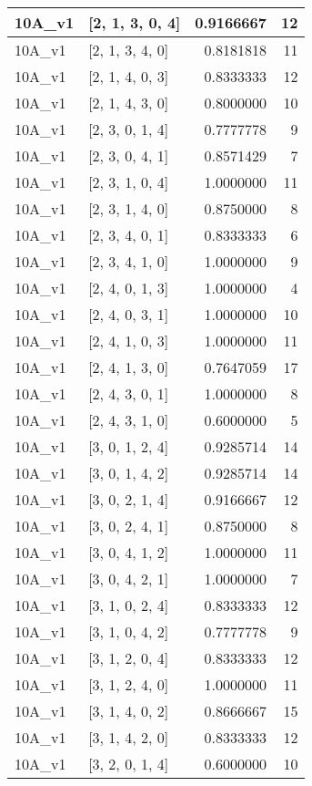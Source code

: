 \documentclass[]{book}
\theoremstyle{definition}
\theoremstyle{definition}
\theoremstyle{definition}
\theoremstyle{remark}
\begin{document}
\begin{tabular}{l|l|r|r}
\hline
10A\_v1 & [2, 1, 3, 0, 4] & 0.9166667 & 12\\
\hline
10A\_v1 & [2, 1, 3, 4, 0] & 0.8181818 & 11\\
\hline
10A\_v1 & [2, 1, 4, 0, 3] & 0.8333333 & 12\\
\hline
10A\_v1 & [2, 1, 4, 3, 0] & 0.8000000 & 10\\
\hline
10A\_v1 & [2, 3, 0, 1, 4] & 0.7777778 & 9\\
\hline
10A\_v1 & [2, 3, 0, 4, 1] & 0.8571429 & 7\\
\hline
10A\_v1 & [2, 3, 1, 0, 4] & 1.0000000 & 11\\
\hline
10A\_v1 & [2, 3, 1, 4, 0] & 0.8750000 & 8\\
\hline
10A\_v1 & [2, 3, 4, 0, 1] & 0.8333333 & 6\\
\hline
10A\_v1 & [2, 3, 4, 1, 0] & 1.0000000 & 9\\
\hline
10A\_v1 & [2, 4, 0, 1, 3] & 1.0000000 & 4\\
\hline
10A\_v1 & [2, 4, 0, 3, 1] & 1.0000000 & 10\\
\hline
10A\_v1 & [2, 4, 1, 0, 3] & 1.0000000 & 11\\
\hline
10A\_v1 & [2, 4, 1, 3, 0] & 0.7647059 & 17\\
\hline
10A\_v1 & [2, 4, 3, 0, 1] & 1.0000000 & 8\\
\hline
10A\_v1 & [2, 4, 3, 1, 0] & 0.6000000 & 5\\
\hline
10A\_v1 & [3, 0, 1, 2, 4] & 0.9285714 & 14\\
\hline
10A\_v1 & [3, 0, 1, 4, 2] & 0.9285714 & 14\\
\hline
10A\_v1 & [3, 0, 2, 1, 4] & 0.9166667 & 12\\
\hline
10A\_v1 & [3, 0, 2, 4, 1] & 0.8750000 & 8\\
\hline
10A\_v1 & [3, 0, 4, 1, 2] & 1.0000000 & 11\\
\hline
10A\_v1 & [3, 0, 4, 2, 1] & 1.0000000 & 7\\
\hline
10A\_v1 & [3, 1, 0, 2, 4] & 0.8333333 & 12\\
\hline
10A\_v1 & [3, 1, 0, 4, 2] & 0.7777778 & 9\\
\hline
10A\_v1 & [3, 1, 2, 0, 4] & 0.8333333 & 12\\
\hline
10A\_v1 & [3, 1, 2, 4, 0] & 1.0000000 & 11\\
\hline
10A\_v1 & [3, 1, 4, 0, 2] & 0.8666667 & 15\\
\hline
10A\_v1 & [3, 1, 4, 2, 0] & 0.8333333 & 12\\
\hline
10A\_v1 & [3, 2, 0, 1, 4] & 0.6000000 & 10\\

\end{tabular}
\end{document}
